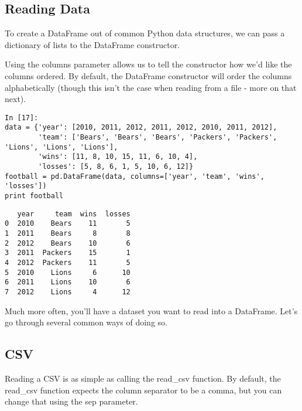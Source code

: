 \documentclass[KSmain.tex]{subfiles}
\begin{document}
 
\subsection{Reading Data}

To create a DataFrame out of common Python data structures, we can pass a dictionary of lists to the DataFrame constructor.

Using the columns parameter allows us to tell the constructor how we'd like the columns ordered. By default, the DataFrame constructor will order the columns alphabetically (though this isn't the case when reading from a file - more on that next).

\begin{framed}
\begin{verbatim}
In [17]:
data = {'year': [2010, 2011, 2012, 2011, 2012, 2010, 2011, 2012],
        'team': ['Bears', 'Bears', 'Bears', 'Packers', 'Packers', 'Lions', 'Lions', 'Lions'],
        'wins': [11, 8, 10, 15, 11, 6, 10, 4],
        'losses': [5, 8, 6, 1, 5, 10, 6, 12]}
football = pd.DataFrame(data, columns=['year', 'team', 'wins', 'losses'])
print football
\end{verbatim}
\end{framed}
\begin{verbatim}
   year     team  wins  losses
0  2010    Bears    11       5
1  2011    Bears     8       8
2  2012    Bears    10       6
3  2011  Packers    15       1
4  2012  Packers    11       5
5  2010    Lions     6      10
6  2011    Lions    10       6
7  2012    Lions     4      12
\end{verbatim}


Much more often, you'll have a dataset you want to read into a DataFrame. Let's go through several common ways of doing so.

\subsection{CSV}

Reading a CSV is as simple as calling the read\_csv function. By default, the read\_csv function expects the column separator to be a comma, but you can change that using the sep parameter.
\end{document}
